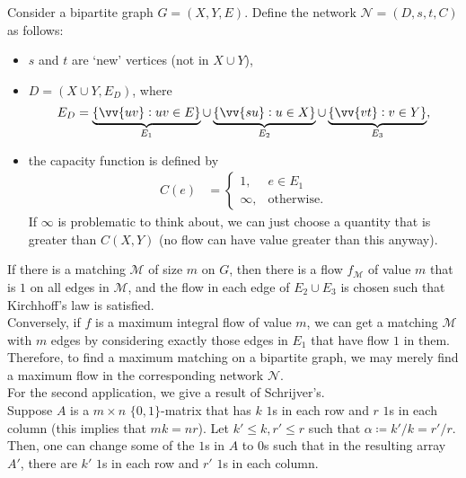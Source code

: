 			Consider a bipartite graph $G = (X,Y,E)$. Define the network $\mathcal{N} = (D,s,t,C)$ as follows:
			\begin{itemize}
				\item $s$ and $t$ are `new' vertices (not in $X\cup Y$),
				\item $D = (X\cup Y, E_D)$, where
				\[ E_D = \underbrace{\{\vv{uv} : uv \in E\}}_{E_1} \cup \underbrace{\{ \vv{su} : u \in X \}}_{E_2} \cup \underbrace{\{ \vv{vt} : v \in Y \}}_{E_3}, \]
				\item the capacity function is defined by
				\begin{align*}
					C(e) &=
					\begin{cases}
						1, & e \in E_1 \\
						\infty, & \text{otherwise}.
					\end{cases}
				\end{align*}
				If $\infty$ is problematic to think about, we can just choose a quantity that is greater than $C(X,Y)$ (no flow can have value greater than this anyway).
			\end{itemize}
			If there is a matching $\mathcal{M}$ of size $m$ on $G$, then there is a flow $f_\mathcal{M}$ of value $m$ that is $1$ on all edges in $\mathcal{M}$, and the flow in each edge of $E_2 \cup E_3$ is chosen such that Kirchhoff's law is satisfied.\\
			Conversely, if $f$ is a maximum integral flow of value $m$, we can get a matching $\mathcal{M}$ with $m$ edges by considering exactly those edges in $E_1$ that have flow $1$ in them.\\
			Therefore, to find a maximum matching on a bipartite graph, we may merely find a maximum flow in the corresponding network $\mathcal{N}$.\\

			For the second application, we give a result of Schrijver's.\\

			Suppose $A$ is a $m\times n$ $\{0,1\}$-matrix that has $k$ $1$s in each row and $r$ $1$s in each column (this implies that $mk=nr$). Let $k' \le k, r' \le r$ such that $\alpha \coloneqq k'/k = r'/r$.\\
			Then, one can change some of the $1$s in $A$ to $0$s such that in the resulting array $A'$, there are $k'$ $1$s in each row and $r'$ $1$s in 
			each column.\\
			
